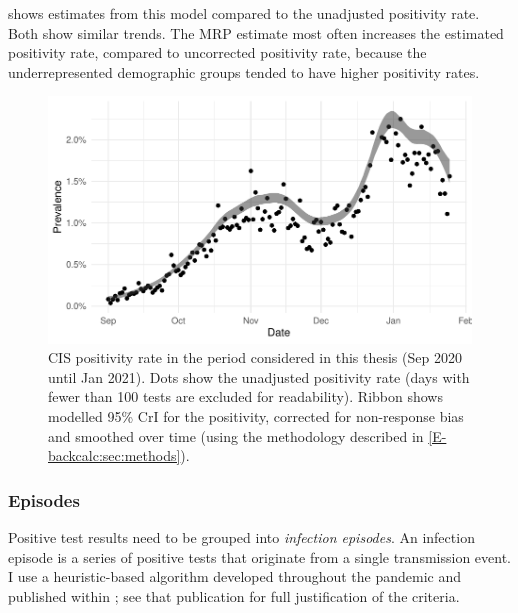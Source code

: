 \documentclass[thesis.tex]{subfiles}
\begin{document}
 shows estimates from this model compared to the unadjusted positivity rate.
Both show similar trends.
The MRP estimate most often increases the estimated positivity rate, compared to uncorrected positivity rate, because the underrepresented demographic groups tended to have higher positivity rates.

\begin{figure}
  \centering \includegraphics[width=\textwidth]{biology-data/CIS-positivity}
  \caption[CIS positivity]{%
    CIS positivity rate in the period considered in this thesis (Sep 2020 until Jan 2021).
    Dots show the unadjusted positivity rate (days with fewer than 100 tests are excluded for readability).
    Ribbon shows modelled 95\% CrI for the positivity, corrected for non-response bias and smoothed over time (using the methodology described in \cref{E-backcalc:sec:methods}).
  }
  \label{biology-data:fig:CIS-positivity}
\end{figure}


\subsubsection{Episodes} \label{biology-data:sec:cis-episodes}

Positive test results need to be grouped into \emph{infection episodes}.
An infection episode is a series of positive tests that originate from a single transmission event.
I use a heuristic-based algorithm developed throughout the pandemic and published within \textcite{weiRisk}; see that publication for full justification of the criteria.
\end{document}
